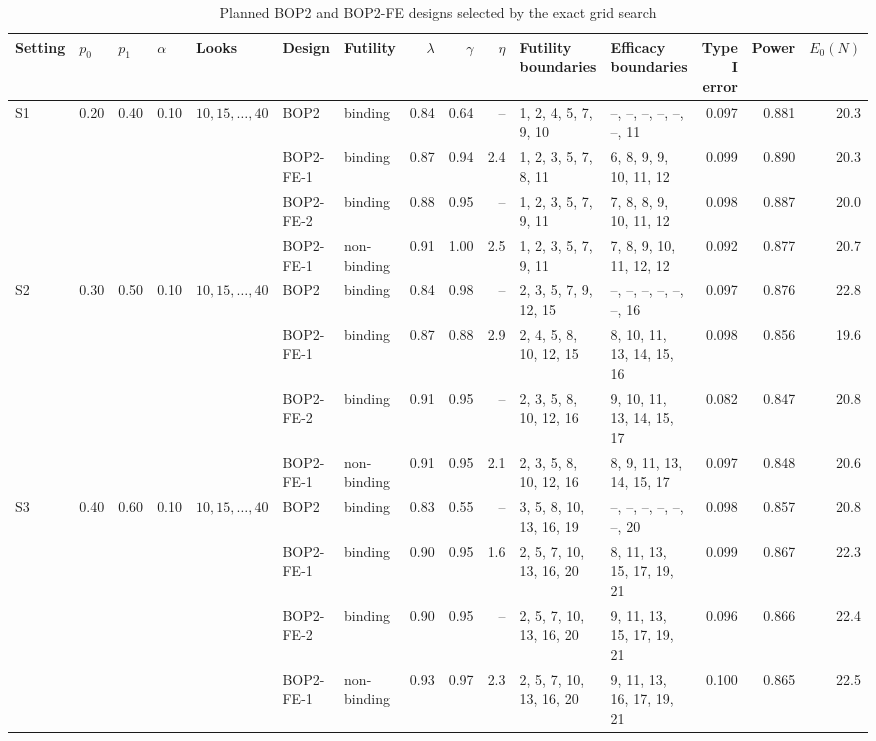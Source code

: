 \begin{table}
\centering
\caption{Planned BOP2 and BOP2-FE designs selected by the exact grid search}
\label{tab:planned}
\scriptsize
\setlength{\tabcolsep}{3pt}
\begin{tabular}{lllllllrrrllrrr}
\toprule
Setting & $p_0$ & $p_1$ & $\alpha$ & Looks & Design & Futility & $\lambda$ & $\gamma$ & $\eta$ & Futility boundaries & Efficacy boundaries & Type I error & Power & $E_0(N)$ \\
\midrule
S1 & 0.20 & 0.40 & 0.10 & $10, 15, \ldots, 40$ & BOP2 & binding & 0.84 & 0.64 & -- & 1, 2, 4, 5, 7, 9, 10 & --, --, --, --, --, --, 11 & 0.097 & 0.881 & 20.3 \\
 &  &  &  &  & BOP2-FE-1 & binding & 0.87 & 0.94 & 2.4 & 1, 2, 3, 5, 7, 8, 11 & 6, 8, 9, 9, 10, 11, 12 & 0.099 & 0.890 & 20.3 \\
 &  &  &  &  & BOP2-FE-2 & binding & 0.88 & 0.95 & -- & 1, 2, 3, 5, 7, 9, 11 & 7, 8, 8, 9, 10, 11, 12 & 0.098 & 0.887 & 20.0 \\
 &  &  &  &  & BOP2-FE-1 & non-binding & 0.91 & 1.00 & 2.5 & 1, 2, 3, 5, 7, 9, 11 & 7, 8, 9, 10, 11, 12, 12 & 0.092 & 0.877 & 20.7 \\
\midrule
S2 & 0.30 & 0.50 & 0.10 & $10, 15, \ldots, 40$ & BOP2 & binding & 0.84 & 0.98 & -- & 2, 3, 5, 7, 9, 12, 15 & --, --, --, --, --, --, 16 & 0.097 & 0.876 & 22.8 \\
 &  &  &  &  & BOP2-FE-1 & binding & 0.87 & 0.88 & 2.9 & 2, 4, 5, 8, 10, 12, 15 & 8, 10, 11, 13, 14, 15, 16 & 0.098 & 0.856 & 19.6 \\
 &  &  &  &  & BOP2-FE-2 & binding & 0.91 & 0.95 & -- & 2, 3, 5, 8, 10, 12, 16 & 9, 10, 11, 13, 14, 15, 17 & 0.082 & 0.847 & 20.8 \\
 &  &  &  &  & BOP2-FE-1 & non-binding & 0.91 & 0.95 & 2.1 & 2, 3, 5, 8, 10, 12, 16 & 8, 9, 11, 13, 14, 15, 17 & 0.097 & 0.848 & 20.6 \\
\midrule
S3 & 0.40 & 0.60 & 0.10 & $10, 15, \ldots, 40$ & BOP2 & binding & 0.83 & 0.55 & -- & 3, 5, 8, 10, 13, 16, 19 & --, --, --, --, --, --, 20 & 0.098 & 0.857 & 20.8 \\
 &  &  &  &  & BOP2-FE-1 & binding & 0.90 & 0.95 & 1.6 & 2, 5, 7, 10, 13, 16, 20 & 8, 11, 13, 15, 17, 19, 21 & 0.099 & 0.867 & 22.3 \\
 &  &  &  &  & BOP2-FE-2 & binding & 0.90 & 0.95 & -- & 2, 5, 7, 10, 13, 16, 20 & 9, 11, 13, 15, 17, 19, 21 & 0.096 & 0.866 & 22.4 \\
 &  &  &  &  & BOP2-FE-1 & non-binding & 0.93 & 0.97 & 2.3 & 2, 5, 7, 10, 13, 16, 20 & 9, 11, 13, 16, 17, 19, 21 & 0.100 & 0.865 & 22.5 \\

\end{tabular}
\end{table}
